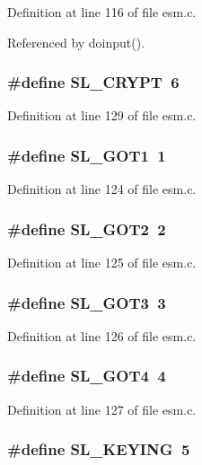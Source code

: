Definition at line 116 of file esm.c.

Referenced by doinput().
\subsubsection{\setlength{\rightskip}{0pt plus 5cm}\#define SL\_\-CRYPT\ 6}\label{esm_8c_a9}




Definition at line 129 of file esm.c.
\subsubsection{\setlength{\rightskip}{0pt plus 5cm}\#define SL\_\-GOT1\ 1}\label{esm_8c_a4}




Definition at line 124 of file esm.c.
\subsubsection{\setlength{\rightskip}{0pt plus 5cm}\#define SL\_\-GOT2\ 2}\label{esm_8c_a5}




Definition at line 125 of file esm.c.
\subsubsection{\setlength{\rightskip}{0pt plus 5cm}\#define SL\_\-GOT3\ 3}\label{esm_8c_a6}




Definition at line 126 of file esm.c.
\subsubsection{\setlength{\rightskip}{0pt plus 5cm}\#define SL\_\-GOT4\ 4}\label{esm_8c_a7}




Definition at line 127 of file esm.c.
\subsubsection{\setlength{\rightskip}{0pt plus 5cm}\#define SL\_\-KEYING\ 5}\label{esm_8c_a8}




